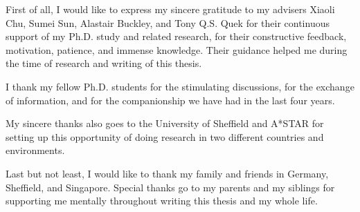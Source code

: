 \clearpage


\begin{acknowledgements}

First of all, I would like to express my sincere gratitude to my advisers Xiaoli Chu, Sumei Sun, Alastair Buckley, and Tony Q.S. Quek for their continuous support of my Ph.D. study and related research, for their constructive feedback, motivation, patience, and immense knowledge. Their guidance helped me during the time of research and writing of this thesis. 

I thank my fellow Ph.D. students for the stimulating discussions, for the exchange of information, and for the companionship we have had in the last four years.

My sincere thanks also goes to the University of Sheffield and A*STAR for setting up this opportunity of doing research in two different countries and environments. 

Last but not least, I would like to thank my family and friends in Germany, Sheffield, and Singapore. Special thanks go to my parents and my siblings for supporting me mentally throughout writing this thesis and my whole life.

\end{acknowledgements}






 



 


 

